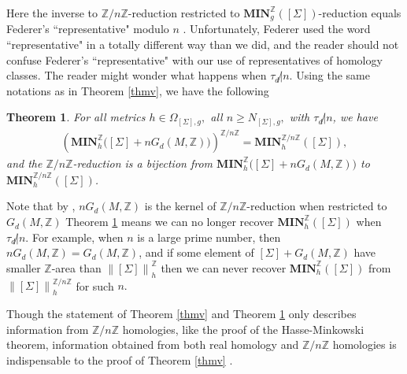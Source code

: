 \documentclass[11pt,a4paper]{amsart}
\numberwithin{equation}{section}
\newcommand{\mn}{\mathbf{MIN}}
\newcommand{\Om}{\Omega}
\newcommand{\Si}{\Sigma}
\newcommand{\no}[1]{\left\lVert#1\right\rVert}
\newcommand{\Z}{\mathbb{Z}}
\theoremstyle{plain}
\newtheorem{thm}{Theorem}
\theoremstyle{definition}
\numberwithin{equation}{subsection}
\begin{document}
	Here the inverse to $\Z/n\Z$-reduction restricted to $\mn_g^{\Z}\left([\Si]\right)$-reduction equals Federer's ``representative" modulo $n$ \cite[Section 4.2.26]{HF}. Unfortunately, Federer used the word ``representative" in a totally different way than we did, and the reader should not confuse Federer's ``representative" with our use of representatives of homology classes. The reader might wonder what happens when $\tau_d\not|n.$ 
	Using the same notations as in Theorem \ref{thmv}, we have the following 	\begin{thm}\label{thmvg} For all metrics $h\in\Om_{[\Si],g},$ all $n\ge N_{[\Si],g},$ with $\tau_d\not|n$, we have
		\begin{align*}
		\left(\mn_h^{\Z}\big([\Si]+nG_d(M,\Z)\big)
		\right)^{\Z/n\Z}=\mn_h^{\Z/n\Z}([\Si]),
		\end{align*} and the $\Z/n\Z$-reduction is a bijection from $\mn_h^{\Z}\big([\Si]+nG_d(M,\Z)\big)$ to $\mn_h^{\Z/n\Z}([\Si])$.
	\end{thm}
	Note that  by \cite[Section 3.2 p. 215 property (5)]{AH}, $nG_d(M,\Z)$ is the kernel of $\Z/n\Z$-reduction when restricted to $G_d(M,\Z)$
	Theorem \ref{thmvg} means we can no longer recover $\mn_h^{\Z}([\Si])$ when $\tau_d\not|n.$   
	For example, when $n$ is a large prime number, then $nG_d(M,\Z)=G_d(M,\Z)$, and if some element of $[\Si]+G_d(M,\Z)$ have smaller $\Z$-area than $\no{[\Si]}_h^{\Z}$ then we can never recover  $\mn_h^{\Z}([\Si])$ from $\no{[\Si]}_h^{\Z/n\Z}$ for such $n.$
	
	Though the statement of Theorem \ref{thmv} and Theorem \ref{thmvg} only describes information from $\Z/n\Z$ homologies, like the proof of the Hasse-Minkowski theorem, information obtained from both real homology and $\Z/n\Z$ homologies is indispensable to the proof of Theorem \ref{thmv} . 
	
\end{document}
